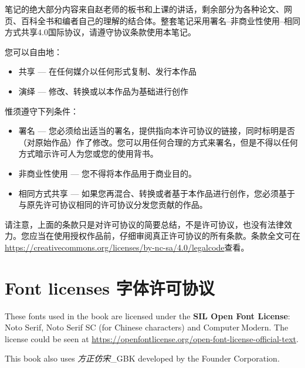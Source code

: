 笔记的绝大部分内容来自赵老师的板书和上课的讲话，剩余部分为各种论文、网页、百科全书和编者自己的理解的结合体。整套笔记采用署名--非商业性使用--相同方式共享4.0国际协议，请遵守协议条款使用本笔记。

您可以自由地：
\begin{itemize}
    \item 共享 --- 在任何媒介以任何形式复制、发行本作品
    \item 演绎 --- 修改、转换或以本作品为基础进行创作
\end{itemize}

惟须遵守下列条件：
\begin{itemize}
    \item 署名 --- 您必须给出适当的署名，提供指向本许可协议的链接，同时标明是否（对原始作品）作了修改。您可以用任何合理的方式来署名，但是不得以任何方式暗示许可人为您或您的使用背书。
    \item 非商业性使用 --- 您不得将本作品用于商业目的。
    \item 相同方式共享 --- 如果您再混合、转换或者基于本作品进行创作，您必须基于与原先许可协议相同的许可协议分发您贡献的作品。
\end{itemize}

请注意，上面的条款只是对许可协议的简要总结，不是许可协议，也没有法律效力。您应当在使用授权作品前，仔细审阅真正许可协议的所有条款。条款全文可在\url{https://creativecommons.org/licenses/by-nc-sa/4.0/legalcode}查看。

\section*{Font licenses 字体许可协议}

These fonts used in the book are licensed under the \textbf{SIL Open Font License}: Noto Serif, Noto Serif SC (for Chinese characters) and $\mathrm{Computer \ Modern}$. The license could be seen at \url{https://openfontlicense.org/open-font-license-official-text}.

This book also uses \textit{方正仿宋}\_GBK developed by the Founder Corporation.
